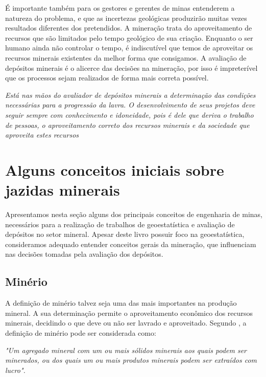 É importante também para os gestores e gerentes de minas entenderem a natureza do problema, e que as incertezas geológicas produzirão muitas vezes resultados diferentes dos pretendidos. A mineração trata do aproveitamento de recursos que são limitados pelo tempo geológico de sua criação. Enquanto o ser humano ainda não controlar o tempo, é indiscutível que temos de aproveitar os recursos minerais existentes da melhor forma que consigamos. A avaliação de depósitos minerais é o alicerce das decisões na mineração, por isso é impreterível que os processos sejam realizados de forma mais correta possível. 

\begin{proposition}
	\textit{Está nas mãos do avaliador de depósitos minerais a determinação das condições necessárias para a progressão da lavra. O desenvolvimento de seus projetos deve seguir sempre com conhecimento e idoneidade, pois é dele que deriva o trabalho de pessoas, o aproveitamento correto dos recursos minerais e da sociedade que aproveita estes recursos}
\end{proposition}

\section{Alguns conceitos iniciais sobre jazidas minerais}

Apresentamos nesta seção alguns dos principais conceitos de engenharia de minas, necessários para a realização de trabalhos de geoestatística e avaliação de depósitos no setor mineral. Apesar deste livro possuir foco na geoestatística, consideramos adequado entender conceitos gerais da mineração, que influenciam nas decisões tomadas pela avaliação dos depósitos.

\subsection{Minério} 

A definição de minério talvez seja uma das mais importantes na produção mineral. A sua determinação permite o aproveitamento econômico dos recursos minerais, decidindo o que deve ou não ser lavrado e aproveitado. Segundo \citet{hustrulid2006open}, a definição de minério pode ser considerada como:

\begin{remark}
	\textit{"Um agregado mineral com um ou mais sólidos minerais aos quais podem ser minerados, ou dos quais um ou mais produtos minerais podem ser extraídos com lucro".  \citet{hustrulid2006open}}
\end{remark}

